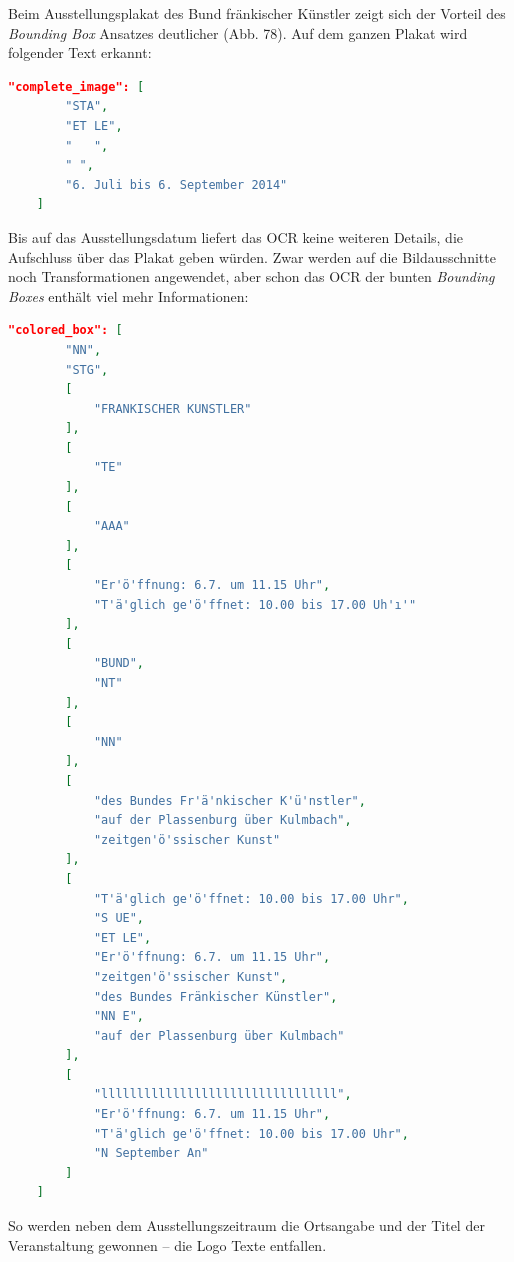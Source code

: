 \documentclass[a4paper,12pt,ngerman]{article}
\begin{document}
Beim Ausstellungsplakat des Bund fränkischer Künstler zeigt sich der Vorteil des \textit{Bounding Box} Ansatzes deutlicher (Abb. 78). Auf dem ganzen Plakat wird folgender Text erkannt:

\begin{lstlisting}[language=json,escapeinside='']
	"complete_image": [
        "STA",
        "ET LE",
        "   ",
        " ",
        "6. Juli bis 6. September 2014"
    ]
\end{lstlisting}

Bis auf das Ausstellungsdatum liefert das OCR keine weiteren Details, die Aufschluss über das Plakat geben würden. Zwar werden auf die Bildausschnitte noch Transformationen angewendet, aber schon das OCR der bunten \textit{Bounding Boxes} enthält viel mehr Informationen:

\begin{lstlisting}[language=json,escapeinside='']
	"colored_box": [
        "NN",
        "STG",
        [
            "FRANKISCHER KUNSTLER"
        ],
        [
            "TE"
        ],
        [
            "AAA"
        ],
        [
            "Er'ö'ffnung: 6.7. um 11.15 Uhr",
            "T'ä'glich ge'ö'ffnet: 10.00 bis 17.00 Uh'ı'"
        ],
        [
            "BUND",
            "NT"
        ],
        [
            "NN"
        ],
        [
            "des Bundes Fr'ä'nkischer K'ü'nstler",
            "auf der Plassenburg über Kulmbach",
            "zeitgen'ö'ssischer Kunst"
        ],
        [
            "T'ä'glich ge'ö'ffnet: 10.00 bis 17.00 Uhr",
            "S UE",
            "ET LE",
            "Er'ö'ffnung: 6.7. um 11.15 Uhr",
            "zeitgen'ö'ssischer Kunst",
            "des Bundes Fränkischer Künstler",
            "NN E",
            "auf der Plassenburg über Kulmbach"
        ],
        [
            "lllllllllllllllllllllllllllllllll",
            "Er'ö'ffnung: 6.7. um 11.15 Uhr",
            "T'ä'glich ge'ö'ffnet: 10.00 bis 17.00 Uhr",
            "N September An"
        ]
    ]
\end{lstlisting}

So werden neben dem Ausstellungszeitraum die Ortsangabe und der Titel der Veranstaltung gewonnen -- die Logo Texte entfallen.\\
\end{document}
